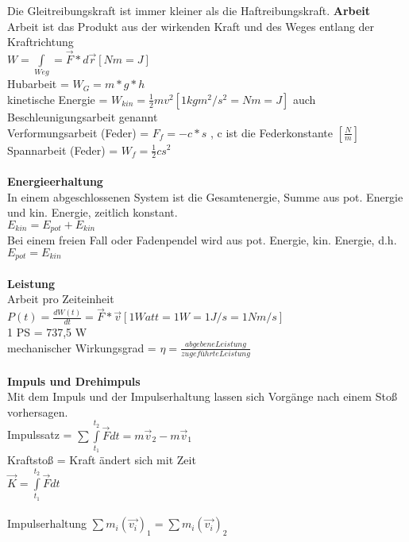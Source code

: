 \documentclass[8pt]{article}
\begin{document}
Die Gleitreibungskraft ist immer kleiner als die Haftreibungskraft.
\newpage
\noindent
\textbf{Arbeit}\\
Arbeit ist das Produkt aus der wirkenden Kraft  und des Weges entlang der Kraftrichtung\\
$W = \int \limits_{Weg} = \overrightarrow{F}*d\overrightarrow{r} [Nm = J]$\\
Hubarbeit = $W_G=m*g*h$\\
kinetische Energie = $W_{kin} = \frac{1}{2}mv^2 [1kgm^2/s^2 = Nm = J]$ auch Beschleunigungsarbeit genannt\\
Verformungsarbeit (Feder) = $F_f = -c*s$ , c ist die Federkonstante $[\frac{N}{m}]$ \\
Spannarbeit (Feder) = $W_f = \frac{1}{2}cs^2$ \\ \\
\noindent
\textbf{Energieerhaltung}\\
In einem abgeschlossenen System ist die Gesamtenergie, Summe aus pot. Energie und kin. Energie, zeitlich konstant.\\
$E_{kin} = E_{pot}+E_{kin}$\\
Bei einem freien Fall oder Fadenpendel wird aus pot. Energie, kin. Energie, d.h. $E_{pot} = E_{kin}$ \\ \\
\noindent
\textbf{Leistung}\\
Arbeit pro Zeiteinheit\\
$P(t) = \frac{dW(t)}{dt} = \overrightarrow{F}*\overrightarrow{v} [1 Watt = 1W = 1 J/s = 1 Nm/s]$ \\
1 PS = 737,5 W\\
mechanischer Wirkungsgrad = $\eta = \frac{abgebene Leistung}{zu geführte Leistung}$ \\ \\
\noindent
\textbf{Impuls und Drehimpuls}\\
Mit dem Impuls und der Impulserhaltung lassen sich Vorgänge nach einem Stoß vorhersagen.\\
Impulssatz = $\sum \int \limits_{t_1}^{t_2} \overrightarrow{F}dt = m\overrightarrow{v}_2-m\overrightarrow{v}_1$ \\
Kraftstoß = Kraft ändert sich mit Zeit \\
$\overrightarrow{K} = \int \limits_{t_1}^{t_2}\overrightarrow{F}dt$ \\ \\
\noindent
Impulserhaltung $\sum m_i(\overrightarrow{v_i})_1 = \sum m_i(\overrightarrow{v_i})_2$ \\ \\
\end{document}
